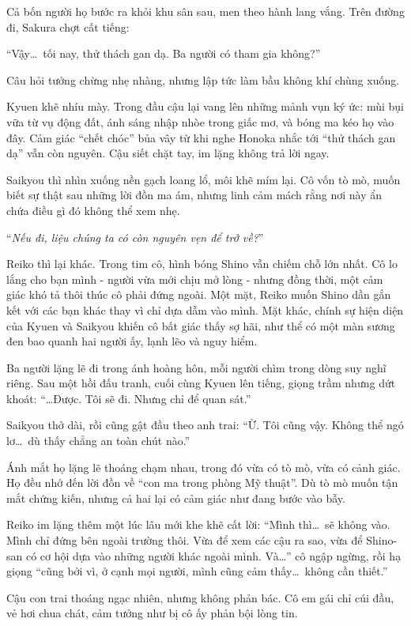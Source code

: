 \documentclass[../main.tex]{subfiles}
\begin{document}
Cả bốn người họ bước ra khỏi khu sân sau, men theo hành lang vắng. Trên đường đi, Sakura chợt cất tiếng:

``Vậy\dots\ tối nay, thử thách gan dạ. Ba người có tham gia không?''

Câu hỏi tưởng chừng nhẹ nhàng, nhưng lập tức làm bầu không khí chùng xuống.

Kyuen khẽ nhíu mày. Trong đầu cậu lại vang lên những mảnh vụn ký ức: mùi bụi vữa từ vụ động đất, ánh sáng nhập nhòe trong giấc mơ, và bóng ma kéo họ vào đây. Cảm giác ``chết chóc'' bủa vây từ khi nghe Honoka nhắc tới ``thử thách gan dạ'' vẫn còn nguyên. Cậu siết chặt tay, im lặng không trả lời ngay.

Saikyou thì nhìn xuống nền gạch loang lổ, môi khẽ mím lại. Cô vốn tò mò, muốn biết sự thật sau những lời đồn ma ám, nhưng linh cảm mách rằng nơi này ẩn chứa điều gì đó không thể xem nhẹ.

``\textit{Nếu đi, liệu chúng ta có còn nguyên vẹn để trở về?}''

Reiko thì lại khác. Trong tim cô, hình bóng Shino vẫn chiếm chỗ lớn nhất. Cô lo lắng cho bạn mình - người vừa mới chịu mở lòng - nhưng đồng thời, một cảm giác khó tả thôi thúc cô phải đứng ngoài. Một mặt, Reiko muốn Shino dần gắn kết với các bạn khác thay vì chỉ dựa dẫm vào mình. Mặt khác, chính sự hiện diện của Kyuen và Saikyou khiến cô bất giác thấy sợ hãi, như thể có một màn sương đen bao quanh hai người ấy, lạnh lẽo và nguy hiểm.

Ba người lặng lẽ đi trong ánh hoàng hôn, mỗi người chìm trong dòng suy nghĩ riêng. Sau một hồi đấu tranh, cuối cùng Kyuen lên tiếng, giọng trầm nhưng dứt khoát: ``\dots Được. Tôi sẽ đi. Nhưng chỉ để quan sát.''

Saikyou thở dài, rồi cũng gật đầu theo anh trai: ``Ừ. Tôi cũng vậy. Không thể ngó lơ\dots\ dù thấy chẳng an toàn chút nào.''

Ánh mắt họ lặng lẽ thoáng chạm nhau, trong đó vừa có tò mò, vừa có cảnh giác. Họ đều nhớ đến lời đồn về “con ma trong phòng Mỹ thuật”. Dù tò mò muốn tận mắt chứng kiến, nhưng cả hai lại có cảm giác như đang bước vào bẫy.

Reiko im lặng thêm một lúc lâu mới khe khẽ cất lời: ``Mình thì\dots\ sẽ không vào. Mình chỉ đứng bên ngoài trường thôi. Vừa để xem các cậu ra sao, vừa để Shino-san có cơ hội dựa vào những người khác ngoài mình. Và\dots'' cô ngập ngừng, rồi hạ giọng ``cũng bởi vì, ở cạnh mọi người, mình cũng cảm thấy\dots\ không cần thiết.''

Cậu con trai thoáng ngạc nhiên, nhưng không phản bác. Cô em gái chỉ cúi đầu, vẻ hơi chua chát, cảm tưởng như bị cô ấy phản bội lòng tin.
\end{document}
